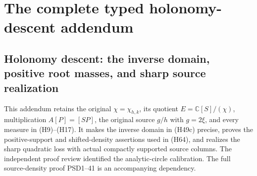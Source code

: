 \begingroup

\section{The complete typed holonomy-descent addendum}


\subsection{Holonomy descent: the inverse domain, positive root masses, and sharp source realization}
This addendum retains the original \(\chi=\chi_{h,k}\), its quotient
\(E=\mathbb C[S]/(\chi)\), multiplication \(A[P]=[SP]\), the original
source \(g/h\) with \(g=2\xi\), and every measure in (H9)--(H17).
It makes the inverse domain in (H49c) precise, proves the positive-support
and shifted-density assertions used in (H64), and realizes the sharp
quadratic loss with actual compactly supported source columns.
The independent proof review identified the analytic-circle calibration.
The full source-density proof PSD1--41 is an accompanying dependency.

